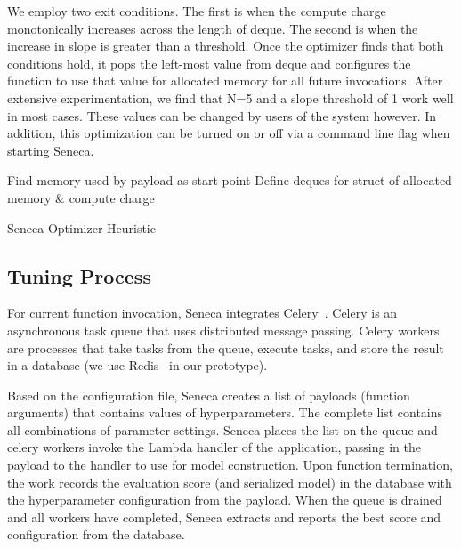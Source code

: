 We employ two exit conditions.  The first is when the 
compute charge monotonically increases across the length of deque. 
The second is when the increase in slope is greater than a threshold. 
Once the optimizer finds that both conditions hold, 
it pops the left-most value from deque and configures 
the function to use that value for allocated memory for all future invocations.
After extensive experimentation, we find that 
N=5 and a slope threshold of 1 work well in most cases.
These values can be changed by users of the system however.
In addition, this optimization can be turned on or off via a command line
flag when starting Seneca.

\begin{algorithm}[]
\SetAlgoLined
{}
Find memory used by payload as start point\;
Define deques for struct of allocated memory \& compute charge\;
 \caption{Seneca Optimizer Heuristic}
 \label{algo:optimizer}
\end{algorithm}

\subsection{Tuning Process}

For current function invocation, Seneca integrates 
Celery~\cite{ref:celery}. Celery is an asynchronous task queue 
that uses distributed message passing. Celery workers are processes 
that take tasks from the queue, execute tasks, and store the
result in a database (we use Redis~\cite{ref:redis} in our prototype). 

Based on the configuration file, Seneca creates a list of 
payloads (function arguments) that contains values of 
hyperparameters.  The complete list contains all combinations of parameter
settings.  Seneca places the list on the queue and celery 
workers invoke the Lambda handler of the application, passing in the
payload to the handler to use for model construction.  Upon function
termination, the work records the evaluation score (and serialized model)
in the database with the hyperparameter configuration from the payload.
When the queue is drained and all workers have completed, Seneca
extracts and reports the best score and configuration from the database.

